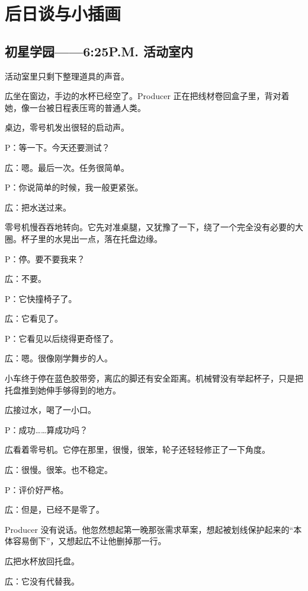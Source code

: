\chapter{后日谈与小插画}

\section*{初星学园——6:25P.M. 活动室内}
{}


活动室里只剩下整理道具的声音。

広坐在窗边，手边的水杯已经空了。Producer 正在把线材卷回盒子里，背对着她，像一台被日程表压弯的普通人类。

桌边，零号机发出很轻的启动声。

P：等一下。今天还要测试？

広：嗯。最后一次。任务很简单。

P：你说简单的时候，我一般更紧张。

広：把水送过来。

零号机慢吞吞地转向。它先对准桌腿，又犹豫了一下，绕了一个完全没有必要的大圈。杯子里的水晃出一点，落在托盘边缘。

P：停。要不要我来？

広：不要。

P：它快撞椅子了。

広：它看见了。

P：它看见以后绕得更奇怪了。

広：嗯。很像刚学舞步的人。

小车终于停在蓝色胶带旁，离広的脚还有安全距离。机械臂没有举起杯子，只是把托盘推到她伸手够得到的地方。

広接过水，喝了一小口。

P：成功……算成功吗？

広看着零号机。它停在那里，很慢，很笨，轮子还轻轻修正了一下角度。

広：很慢。很笨。也不稳定。

P：评价好严格。

広：但是，已经不是零了。

Producer 没有说话。他忽然想起第一晚那张需求草案，想起被划线保护起来的“本体容易倒下”，又想起広不让他删掉那一行。

広把水杯放回托盘。

広：它没有代替我。

